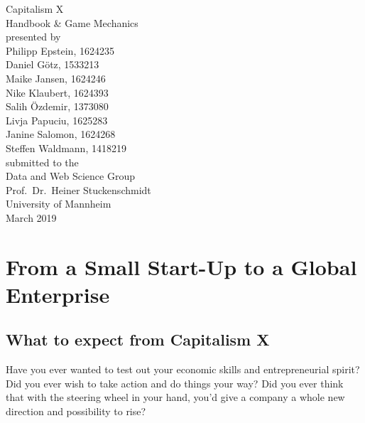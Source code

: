 \documentclass[11pt,titlepage,oneside,openany]{book}
\begin{document}
\begin{titlepage}
	\vspace*{2cm}
  \begin{center}
   {\Large Capitalism X\\}
   \vspace{2cm} 
   {Handbook \& Game Mechanics\\}
   \vspace{2cm}
   {presented by\\
   Philipp Epstein, 1624235\\
    Daniel G\"otz, 1533213\\
Maike Jansen, 1624246\\
Nike Klaubert, 1624393\\
Salih \"Ozdemir, 1373080\\
Livja Papuciu, 1625283\\
Janine Salomon, 1624268\\
Steffen Waldmann, 1418219\\
   }
   \vspace{1cm} 
   {submitted to the\\
    Data and Web Science Group\\
    Prof.\ Dr.\ Heiner Stuckenschmidt\\
    University of Mannheim\\} \vspace{2cm}
   {March 2019}
  \end{center}
\end{titlepage} 

\tableofcontents
\newpage
\printglossary[style=long]
\listoffigures

\listoftables


\newpage

\chapter{From a Small Start-Up to a Global Enterprise}
\label{cha:intro}
\section{What to expect from Capitalism X}
\label{expectation}
Have you ever wanted to test out your economic skills and entrepreneurial spirit? Did you ever wish to take action and do things your way? Did you ever think that with the steering wheel in your hand, you'd give a company a whole new direction and possibility to rise? 
\end{document}
